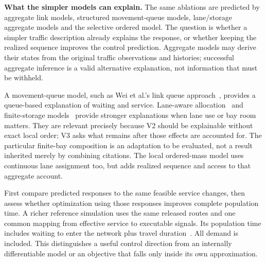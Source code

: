 \documentclass[10pt,a4paper]{article}
\newenvironment{revision}{\begingroup\color{revisionred}}{\par\endgroup}
\begin{document}
\begin{revision}
\textbf{What the simpler models can explain.} The same ablations are
predicted by aggregate link models, structured movement-queue models,
lane/storage aggregate models and the selective ordered model. The
question is whether a simpler traffic description already explains the
response, or whether keeping the realized sequence improves the control
prediction. Aggregate models may derive their states from the original
traffic observations and histories; successful aggregate inference is a
valid alternative explanation, not information that must be withheld.

A movement-queue model, such as Wei et al.'s link queue approach~\cite{wei},
provides a queue-based explanation of waiting and service. Lane-aware
allocation~\cite{gong} and finite-storage models~\cite{liu} provide
stronger explanations when lane use or bay room matters. They are relevant
precisely because V2 should be explainable without exact local order;
V3 asks what remains after those effects are accounted for. The particular
finite-bay composition is an adaptation to be evaluated, not a result
inherited merely by combining citations. The local ordered-mass model
uses continuous lane assignment too, but adds realized sequence and
access to that aggregate account.

First compare predicted responses to the same feasible service changes,
then assess whether optimization using those responses improves complete
population time. A richer reference simulation uses the same released
routes and one common mapping from effective service to executable
signals. Its population time includes waiting to enter the network plus
travel duration~\cite{sumo}. All demand is included. This distinguishes
a useful control direction from an internally differentiable model or
an objective that falls only inside its own approximation.
\end{revision}
\end{document}
